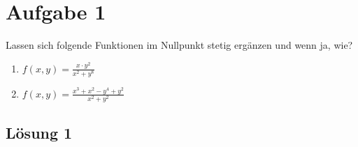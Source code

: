 \documentclass[main.tex]{subfiles}
\begin{document}
\section{Aufgabe 1}

Lassen sich folgende Funktionen im Nullpunkt stetig ergänzen und wenn ja, wie?

\begin{enumerate}
	\item $f(x, y) = \frac{x\cdot y^2}{x^2 + y^8}$
	\item $f(x, y) = \frac{x^3+x^2-y^4+y^2}{x^2+y^2}$
\end{enumerate}

\subsection{Lösung 1}
\end{document}
